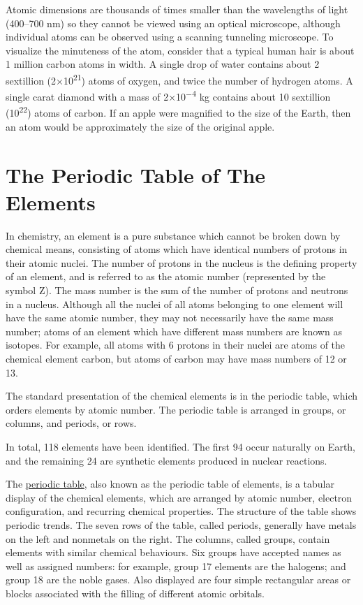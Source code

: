 Atomic dimensions are thousands of times smaller than the wavelengths of light (400--700 nm) so they cannot be viewed using an optical microscope, although individual atoms can be observed using a scanning tunneling microscope. To visualize the minuteness of the atom, consider that a typical human hair is about 1 million carbon atoms in width. A single drop of water contains about 2 sextillion (2×10\textsuperscript{21}) atoms of oxygen, and twice the number of hydrogen atoms. A single carat diamond with a mass of 2×10\textsuperscript{−4} kg contains about 10 sextillion (10\textsuperscript{22}) atoms of carbon. If an apple were magnified to the size of the Earth, then an atom would be approximately the size of the original apple.

\hypertarget{the-periodic-table-of-the-elements}{%
\section{The Periodic Table of The Elements}\label{the-periodic-table-of-the-elements}}

In chemistry, an element is a pure substance which cannot be broken down by chemical means, consisting of atoms which have identical numbers of protons in their atomic nuclei. The number of protons in the nucleus is the defining property of an element, and is referred to as the atomic number (represented by the symbol Z). The mass number is the sum of the number of protons and neutrons in a nucleus. Although all the nuclei of all atoms belonging to one element will have the same atomic number, they may not necessarily have the same mass number; atoms of an element which have different mass numbers are known as isotopes. For example, all atoms with 6 protons in their nuclei are atoms of the chemical element carbon, but atoms of carbon may have mass numbers of 12 or 13.

The standard presentation of the chemical elements is in the periodic table, which orders elements by atomic number. The periodic table is arranged in groups, or columns, and periods, or rows.

In total, 118 elements have been identified. The first 94 occur naturally on Earth, and the remaining 24 are synthetic elements produced in nuclear reactions.

The \href{https://en.wikipedia.org/wiki/Periodic_table}{periodic table}, also known as the periodic table of elements, is a tabular display of the chemical elements, which are arranged by atomic number, electron configuration, and recurring chemical properties. The structure of the table shows periodic trends. The seven rows of the table, called periods, generally have metals on the left and nonmetals on the right. The columns, called groups, contain elements with similar chemical behaviours. Six groups have accepted names as well as assigned numbers: for example, group 17 elements are the halogens; and group 18 are the noble gases. Also displayed are four simple rectangular areas or blocks associated with the filling of different atomic orbitals.



